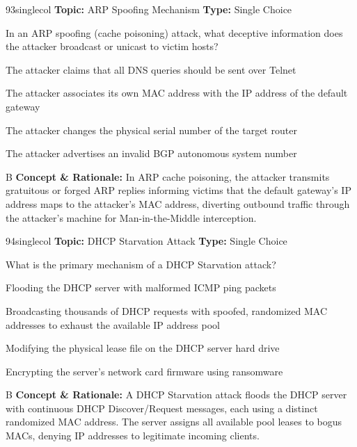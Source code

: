 \begin{qcard}{93}{singlecol}
\textcolor{darkslate!75}{\small\textbf{Topic:} ARP Spoofing Mechanism \hfill \textbf{Type:} Single Choice}\vspace{0.4em}\par
In an ARP spoofing (cache poisoning) attack, what deceptive information does the attacker broadcast or unicast to victim hosts?
\begin{qoptions}
\item The attacker claims that all DNS queries should be sent over Telnet
\item The attacker associates its own MAC address with the IP address of the default gateway
\item The attacker changes the physical serial number of the target router
\item The attacker advertises an invalid BGP autonomous system number
\end{qoptions}
\end{qcard}
\nopagebreak
\begin{explainbox}{B}
\textbf{Concept \& Rationale:} In ARP cache poisoning, the attacker transmits gratuitous or forged ARP replies informing victims that the default gateway's IP address maps to the attacker's MAC address, diverting outbound traffic through the attacker's machine for Man-in-the-Middle interception.
\end{explainbox}

\begin{qcard}{94}{singlecol}
\textcolor{darkslate!75}{\small\textbf{Topic:} DHCP Starvation Attack \hfill \textbf{Type:} Single Choice}\vspace{0.4em}\par
What is the primary mechanism of a DHCP Starvation attack?
\begin{qoptions}
\item Flooding the DHCP server with malformed ICMP ping packets
\item Broadcasting thousands of DHCP requests with spoofed, randomized MAC addresses to exhaust the available IP address pool
\item Modifying the physical lease file on the DHCP server hard drive
\item Encrypting the server's network card firmware using ransomware
\end{qoptions}
\end{qcard}
\nopagebreak
\begin{explainbox}{B}
\textbf{Concept \& Rationale:} A DHCP Starvation attack floods the DHCP server with continuous DHCP Discover/Request messages, each using a distinct randomized MAC address. The server assigns all available pool leases to bogus MACs, denying IP addresses to legitimate incoming clients.
\end{explainbox}


